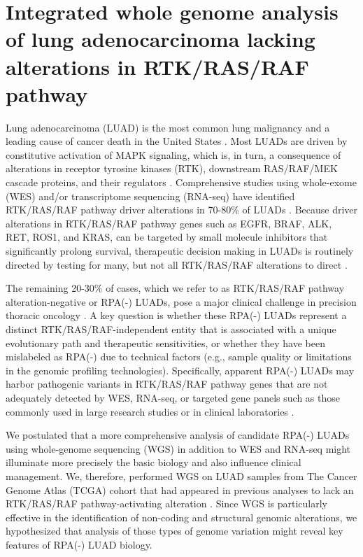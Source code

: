 \documentclass[phd,tocprelim]{cornell}
\begin{document}
\section{Integrated whole genome analysis of lung adenocarcinoma lacking alterations in RTK/RAS/RAF pathway}
Lung adenocarcinoma (LUAD) is the most common lung malignancy and a leading cause of cancer death in the United States \cite{Siegel2019-gb}. Most LUADs are driven by constitutive activation of MAPK signaling, which is, in turn, a consequence of alterations in receptor tyrosine kinases (RTK), downstream RAS/RAF/MEK cascade proteins, and their regulators \cite{Desai2014-qe}. Comprehensive studies using whole-exome (WES) and/or transcriptome sequencing (RNA-seq) have identified RTK/RAS/RAF pathway driver alterations in 70-80\% of LUADs \cite{Campbell2016-xv,Cancer_Genome_Atlas_Research_Network2014-ju,Imielinski2012-vv}. Because driver alterations in RTK/RAS/RAF pathway genes such as EGFR, BRAF, ALK, RET, ROS1, and KRAS, can be targeted by small molecule inhibitors that significantly prolong survival, therapeutic decision making in LUADs is routinely directed by testing for many, but not all RTK/RAS/RAF alterations to direct \cite{Herbst2018-oo}.

The remaining 20-30\% of cases, which we refer to as RTK/RAS/RAF pathway alteration-negative or RPA(-) LUADs, pose a major clinical challenge in precision thoracic oncology \cite{Campbell2016-xv}. A key question is whether these RPA(-) LUADs represent a distinct RTK/RAS/RAF-independent entity that is associated with a unique evolutionary path and therapeutic sensitivities, or whether they have been mislabeled as RPA(-) due to technical factors (e.g., sample quality or limitations in the genomic profiling technologies). Specifically, apparent RPA(-) LUADs may harbor pathogenic variants in RTK/RAS/RAF pathway genes that are not adequately detected by WES, RNA-seq, or targeted gene panels such as those commonly used in large research studies or in clinical laboratories \cite{Vinagre2013-tg,Weischenfeldt2017-jr}.

We postulated that a more comprehensive analysis of candidate RPA(-) LUADs using whole-genome sequencing (WGS) in addition to WES and RNA-seq might illuminate more precisely the basic biology and also influence clinical management. We, therefore, performed WGS on LUAD samples from The Cancer Genome Atlas (TCGA) cohort that had appeared in previous analyses to lack an RTK/RAS/RAF pathway-activating alteration \cite{Campbell2016-xv}. Since WGS is particularly effective in the identification of non-coding and structural genomic alterations, we hypothesized that analysis of those types of genome variation might reveal key features of RPA(-) LUAD biology.
\end{document}
